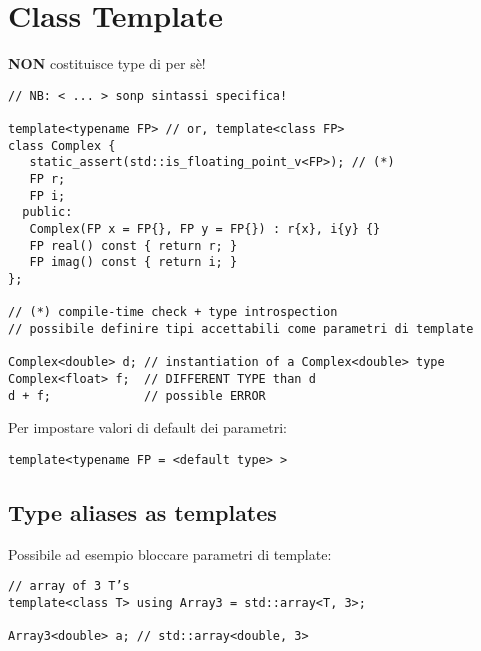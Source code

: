 \documentclass[10pt, oneside]{Book}
\begin{document}
\section{Class Template}
\textbf{NON} costituisce type di per sè!
\begin{verbatim}
// NB: < ... > sonp sintassi specifica! 

template<typename FP> // or, template<class FP>
class Complex {
   static_assert(std::is_floating_point_v<FP>); // (*)
   FP r;
   FP i;
  public:
   Complex(FP x = FP{}, FP y = FP{}) : r{x}, i{y} {}
   FP real() const { return r; }
   FP imag() const { return i; }
};

// (*) compile-time check + type introspection
// possibile definire tipi accettabili come parametri di template

Complex<double> d; // instantiation of a Complex<double> type
Complex<float> f;  // DIFFERENT TYPE than d
d + f;             // possible ERROR
\end{verbatim}
Per impostare valori di default dei parametri:
\begin{verbatim}
template<typename FP = <default type> >
\end{verbatim}
\subsection{Type aliases as templates}
Possibile ad esempio bloccare parametri di template:
\begin{verbatim}
// array of 3 T’s
template<class T> using Array3 = std::array<T, 3>;

Array3<double> a; // std::array<double, 3>
\end{verbatim}
\end{document}
